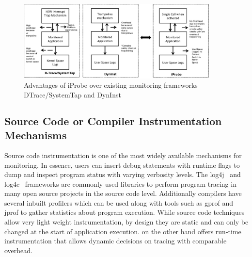 \begin{figure}[ht]
	\begin{center}
		\includegraphics[width=0.9\textwidth]{iprobe/Images/related.eps}
		\caption{Advantages of iProbe over existing monitoring frameworks DTrace/SystemTap and DynInst}
		\label{fig:related}
	\end{center}
\end{figure}

\subsection{Source Code or Compiler Instrumentation Mechanisms}
Source code instrumentation is one of the most widely available mechanisms for monitoring. 
In essence, users can insert debug statements with runtime flags to dump and inspect program status with varying verbosity levels. 
The log4j~\cite{log4j} and log4c~\cite{log4c} frameworks are commonly used libraries to perform program tracing in many open source projects in the source code level. 
Additionally compilers have several inbuilt profilers which can be used along with tools such as gprof and jprof to gather statistics about program execution.
While source code techniques allow very light weight instrumentation, by design they are static and can only be changed at the start of application execution. 
\iprobe on the other hand offers run-time instrumentation that allows dynamic decisions on tracing with comparable overhead.


